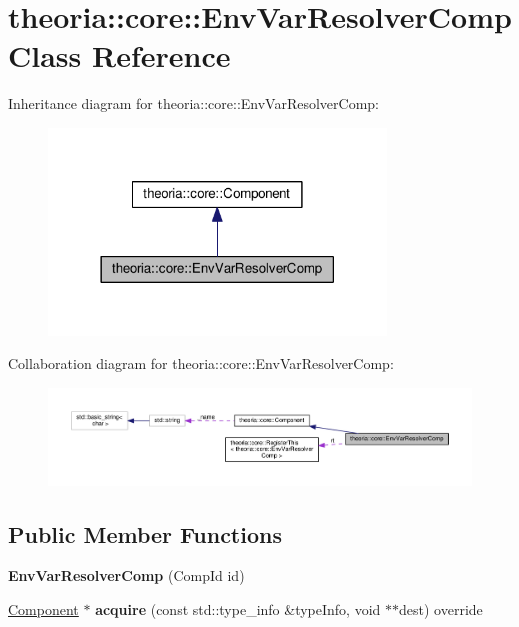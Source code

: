\hypertarget{classtheoria_1_1core_1_1EnvVarResolverComp}{}\section{theoria\+:\+:core\+:\+:Env\+Var\+Resolver\+Comp Class Reference}
\label{classtheoria_1_1core_1_1EnvVarResolverComp}


Inheritance diagram for theoria\+:\+:core\+:\+:Env\+Var\+Resolver\+Comp\+:
\nopagebreak
\begin{figure}[H]
\begin{center}
\leavevmode
\includegraphics[width=254pt]{classtheoria_1_1core_1_1EnvVarResolverComp__inherit__graph}
\end{center}
\end{figure}


Collaboration diagram for theoria\+:\+:core\+:\+:Env\+Var\+Resolver\+Comp\+:
\nopagebreak
\begin{figure}[H]
\begin{center}
\leavevmode
\includegraphics[width=350pt]{classtheoria_1_1core_1_1EnvVarResolverComp__coll__graph}
\end{center}
\end{figure}
\subsection*{Public Member Functions}
\begin{DoxyCompactItemize}
\item 
\mbox{\label{classtheoria_1_1core_1_1EnvVarResolverComp_a0d015c8dd5ad4e8f2b1e33af88f0791a}} 
{\bfseries Env\+Var\+Resolver\+Comp} (Comp\+Id id)
\item 
\mbox{\label{classtheoria_1_1core_1_1EnvVarResolverComp_aac22e843f14123d2627f8c8ca0311b80}} 
\hyperlink{classtheoria_1_1core_1_1Component}{Component} $\ast$ {\bfseries acquire} (const std\+::type\+\_\+info \&type\+Info, void $\ast$$\ast$dest) override
\end{DoxyCompactItemize}
